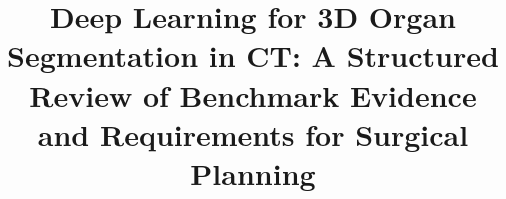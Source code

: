 \title{Deep Learning for 3D Organ Segmentation in CT: A Structured Review of Benchmark Evidence and Requirements for Surgical Planning}
